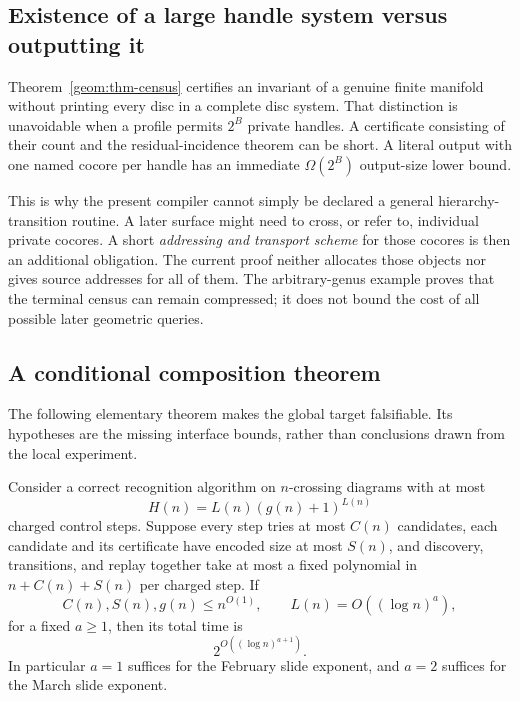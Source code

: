 \subsection{Existence of a large handle system versus outputting it}

Theorem~\ref{geom:thm-census} certifies an invariant of a genuine finite
manifold without printing every disc in a complete disc system.  That
distinction is unavoidable when a profile permits $2^B$ private handles.
A certificate consisting of their count and the residual-incidence
theorem can be short.  A literal output with one named cocore per handle
has an immediate $\Omega(2^B)$ output-size lower bound.

This is why the present compiler cannot simply be declared a general
hierarchy-transition routine.  A later surface might need to cross, or
refer to, individual private cocores.  A short \emph{addressing and
transport scheme} for those cocores is then an additional obligation.
The current proof neither allocates those objects nor gives source
addresses for all of them.  The arbitrary-genus example proves that the
terminal census can remain compressed; it does not bound the cost of
all possible later geometric queries.

\subsection{A conditional composition theorem}

The following elementary theorem makes the global target falsifiable.
Its hypotheses are the missing interface bounds, rather than conclusions
drawn from the local experiment.

\begin{theorem}
\label{thm:conditional-composition}
Consider a correct recognition algorithm on $n$-crossing diagrams with
at most
\[
 H(n)=L(n)(g(n)+1)^{L(n)}
\]
charged control steps.  Suppose every step tries at most $C(n)$ candidates,
each candidate and its certificate have encoded size at most $S(n)$,
and discovery, transitions, and replay together take at most a fixed
polynomial in $n+C(n)+S(n)$ per charged step.  If
\[
 C(n),S(n),g(n)\leq n^{O(1)},
 \qquad L(n)=O((\log n)^a),
\]
for a fixed $a\geq1$, then its total time is
\[
 2^{O((\log n)^{a+1})}.
\]
In particular $a=1$ suffices for the February slide exponent, and $a=2$
suffices for the March slide exponent.
\end{theorem}

